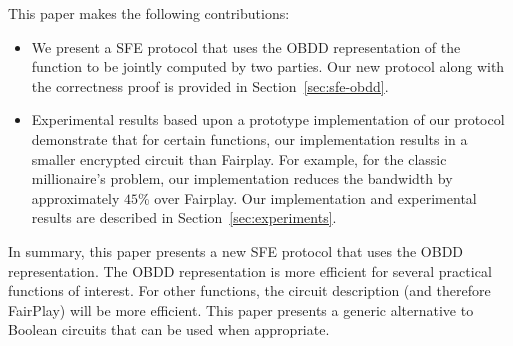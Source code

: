 This paper makes the following contributions:
\begin{itemize}
\item We present a SFE protocol that uses the OBDD representation of
the function to be jointly computed by two parties. Our new protocol along with the
correctness proof is provided in Section~\ref{sec:sfe-obdd}.

\item 
Experimental results based upon a prototype implementation of our
protocol demonstrate that for certain functions, our
implementation results in a smaller encrypted circuit than
Fairplay. For example, for the classic millionaire's problem, our
implementation reduces the bandwidth by approximately $45$\% over Fairplay.  Our
implementation and experimental results are described in
Section~\ref{sec:experiments}.
\end{itemize}
In summary, this paper presents a new SFE protocol that uses the OBDD representation.
The OBDD representation is more efficient for several practical functions of 
interest. For other functions, the circuit description (and therefore
FairPlay) will be more efficient. This paper presents a generic alternative to 
Boolean circuits that can be used when appropriate. 


